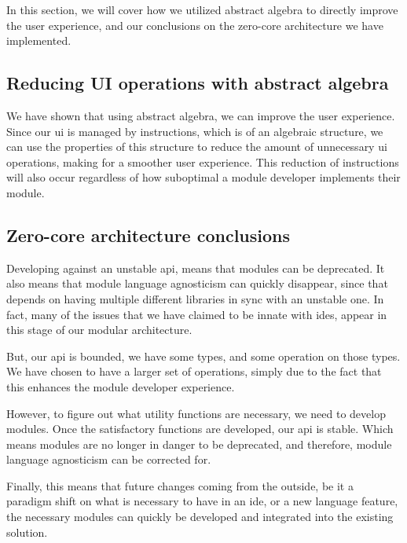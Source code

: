 In this section, we will cover how we utilized abstract algebra to directly
improve the user experience, and our conclusions on the zero-core
architecture we have implemented.


\subsection{Reducing UI operations with abstract algebra}

We have shown that using abstract algebra, we can improve the user experience.
Since our \gls*{ui} is managed by instructions, which is of an algebraic
structure, we can use the properties of this structure to reduce the amount of
unnecessary \gls*{ui} operations, making for a smoother user experience. This
reduction of instructions will also occur regardless of how suboptimal a module
developer implements their module.


\subsection{Zero-core architecture conclusions}

Developing against an unstable \gls*{api}, means that modules can be
deprecated. It also means that module language agnosticism can quickly
disappear, since that depends on having multiple different libraries in sync
with an unstable one. In fact, many of the issues that we have claimed to be
innate with \gls*{ide}s, appear in this stage of our modular architecture.

But, our \gls*{api} is bounded, we have some types, and some operation on those
types. We have chosen to have a larger set of operations, simply due to the
fact that this enhances the module developer experience.

However, to figure out what utility functions are necessary, we need to develop
modules. Once the satisfactory functions are developed, our \gls*{api} is
stable. Which means modules are no longer in danger to be deprecated, and
therefore, module language agnosticism can be corrected for.

Finally, this means that future changes coming from the outside, be it a
paradigm shift on what is necessary to have in an \gls*{ide}, or a new language
feature, the necessary modules can quickly be developed and integrated into the
existing solution.

